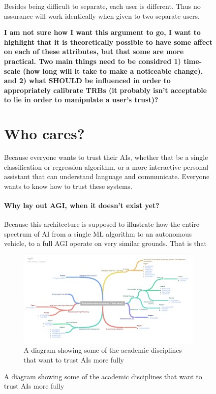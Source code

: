 \begin{figure}[htbp]
    Besides being difficult to separate, each user is different. Thus no assurance will work identically when given to two separate users.

    \textbf{I am not sure how I want this argument to go, I want to highlight that it is theoretically possible to have some affect on each of these attributes, but that some are more practical. Two main things need to be considred 1) time-scale (how long will it take to make a noticeable change), and 2) what SHOULD be influenced in order to appropriately calibrate TRBs (it probably isn't acceptable to lie in order to manipulate a user's trust)?}
    

\section{Who cares?}
    Because everyone wants to trust their AIs, whether that be a single classification or regression algorithm, or a more interactive personal assistant that can understand language and communicate. Everyone wants to know how to trust these systems.  

    \paragraph{Why lay out AGI, when it doesn't exist yet?} Because this architecture is supposed to illustrate how the entire spectrum of AI from a single ML algorithm to an autonomous vehicle, to a full AGI operate on very similar grounds. That is that 

	\begin{figure}
        \includegraphics[width=8in]{Figures/WhoCares.pdf}%
    	\caption{A diagram showing some of the academic disciplines that want to trust AIs more fully}
        \label{fig:WhoCares}
    \end{figure}


\end{figure}
